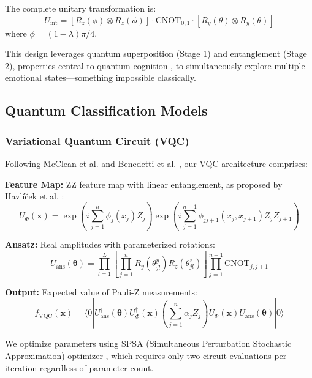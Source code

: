 \documentclass[11pt,letterpaper]{article}
\newcommand{\ket}[1]{|#1\rangle}
\newcommand{\bra}[1]{\langle#1|}
\begin{document}
The complete unitary transformation is:
\begin{equation}
U_{\text{int}} = \left[R_z(\phi) \otimes R_z(\phi)\right] \cdot \text{CNOT}_{0,1} \cdot \left[R_y(\theta) \otimes R_y(\theta)\right]
\label{eq:intervention_unitary}
\end{equation}
where $\phi = (1-\lambda)\pi/4$.

This design leverages quantum superposition (Stage 1) and entanglement (Stage 2), properties central to quantum cognition \cite{aerts2009quantum}, to simultaneously explore multiple emotional states---something impossible classically.

\subsection{Quantum Classification Models}

\subsubsection{Variational Quantum Circuit (VQC)}

Following McClean et al. \cite{mcclean2016theory} and Benedetti et al. \cite{benedetti2019parameterized}, our VQC architecture comprises:

\textbf{Feature Map:} ZZ feature map with linear entanglement, as proposed by Havlíček et al. \cite{havlicek2019supervised}:
\begin{equation}
U_{\Phi}(\mathbf{x}) = \exp\left(i\sum_{j=1}^{n}\phi_j(x_j) Z_j\right) \exp\left(i\sum_{j=1}^{n-1}\phi_{jj+1}(x_j, x_{j+1})Z_j Z_{j+1}\right)
\end{equation}

\textbf{Ansatz:} Real amplitudes with parameterized rotations:
\begin{equation}
U_{\text{ans}}(\boldsymbol{\theta}) = \prod_{l=1}^{L} \left[\prod_{j=1}^{n}R_y(\theta_{jl}^y)R_z(\theta_{jl}^z)\right] \prod_{j=1}^{n-1}\text{CNOT}_{j,j+1}
\end{equation}

\textbf{Output:} Expected value of Pauli-Z measurements:
\begin{equation}
f_{\text{VQC}}(\mathbf{x}) = \bra{0}U_{\text{ans}}^\dagger(\boldsymbol{\theta}) U_{\Phi}^\dagger(\mathbf{x}) \left(\sum_{j=1}^{n}\alpha_j Z_j\right) U_{\Phi}(\mathbf{x}) U_{\text{ans}}(\boldsymbol{\theta})\ket{0}
\label{eq:vqc_output}
\end{equation}

We optimize parameters using SPSA (Simultaneous Perturbation Stochastic Approximation) optimizer \cite{spall1992multivariate}, which requires only two circuit evaluations per iteration regardless of parameter count.
\end{document}
